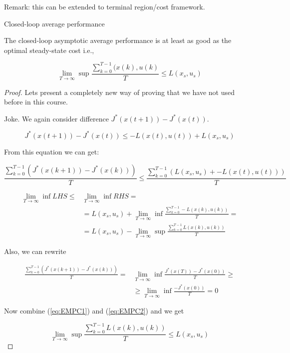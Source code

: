 Remark: this can be extended to terminal region/cost framework.

Closed-loop average performance

\begin{Theorem}
 The closed-loop asymptotic average performance is at least as good as the
 optimal steady-state cost i.e.,

 $$\lim_{T\rightarrow\infty}\sup\frac{\sum_{k=0}^{T-1}(x(k),u(k)}{T}\le L(x_s,u_s)$$

 \begin{proof}
  Lets present a completely new way of proving that we have not used before 
  in this course.

  Joke. We again consider difference $J^*(x(t+1))-J^*(x(t))$.

  $$J^*(x(t+1))-J^*(x(t))\le -L(x(t),u(t)) + L(x_s,u_s)$$

  From this equation we can get:

  $$\frac{\sum_{k=0}^{T-1}\left(J^*(x(k+1))-J^*(x(k))\right)}{T}\le\frac{\sum_{k=0}^{T-1}\left(L(x_s,u_s)+-L(x(t),u(t))\right)}{T}$$

  \begin{equation}\label{eq:EMPC1}
   \begin{split}
    \lim_{T\rightarrow\infty}\inf LHS \le &\lim_{T\rightarrow\infty}\inf RHS = \\
    &= L(x_s,u_s)+\lim_{T\rightarrow\infty}\inf\frac{\sum_{k=0}^{T-1}-L(x(k),u(k))}{T} = \\
    &= L(x_s,u_s)-\lim_{T\rightarrow\infty}\sup\frac{\sum_{k=0}^{T-1}L(x(k),u(k))}{T} 
   \end{split}
  \end{equation}

  Also, we can rewrite

  \begin{equation}\label{eq:EMPC2}
   \begin{split}
    \frac{\sum_{k=0}^{T-1}\left(J^*(x(k+1))-J^*(x(k))\right)}{T}=&\lim_{T\rightarrow\infty}\inf\frac{J^*(x(T))-J^*(x(0))}{T} \ge \\
                       &\ge\lim_{T\rightarrow\infty}\inf\frac{-J^*(x(0))}{T} = 0
   \end{split}
  \end{equation}

  Now combine (\ref{eq:EMPC1}) and (\ref{eq:EMPC2}) and we get

  $$\lim_{T\rightarrow\infty}\sup\frac{\sum_{k=0}^{T-1}L(x(k),u(k))}{T} \le L(x_s,u_s)$$
 \end{proof}
\end{Theorem}


